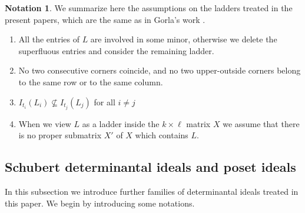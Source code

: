 \documentclass[12pt]{amsart}
\renewcommand{\leq}{\leqslant}
\theoremstyle{definition}
\newtheorem{notation}[notation]{Notation}
\renewcommand{\(}{\left(}
\renewcommand{\)}{\right)}
\renewcommand{\!}[1]{{\color{red}\text{\Huge$\star$ }#1}}
\begin{document}
\begin{notation} \label{running assumptions ladder} We summarize here the assumptions on the ladders treated in the present papers, which are the same as in  Gorla's work \cite{GorlaMixed}.
	\begin{enumerate}[(1)]
		\item All the entries of $L$ are involved in some minor, otherwise we delete the superfluous entries and consider the remaining  ladder. 
		\item No two consecutive corners coincide, and no two upper-outside corners belong to the same row or to the same column.
		\item  $I_{t_i}(L_i) \not\subseteq I_{t_j}(L_j)$ for all $i \ne j$
		\item When we view $L$ as a ladder inside the $k \times \ell$ matrix $X$ we assume that there is no proper submatrix $X'$ of $X$ which contains $L$.
	\end{enumerate}
\end{notation}





\subsection{Schubert determinantal ideals and  poset ideals}\label{sub_affine_schub}


 
In this  subsection we introduce further families of determinantal ideals treated in this paper. %
We begin by introducing some notations. 
\end{document}
